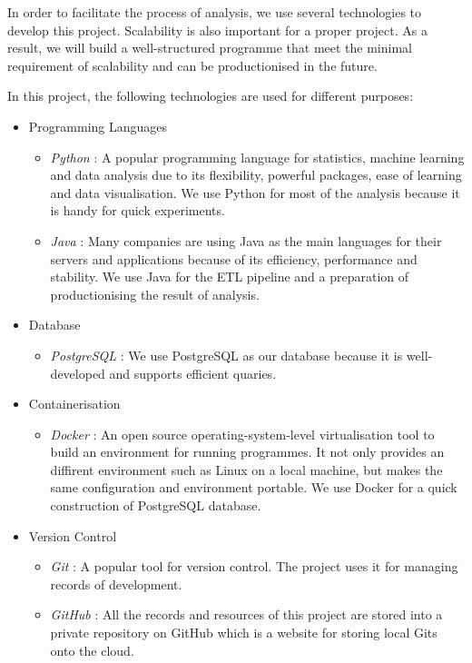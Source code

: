 \documentclass[11pt]{article} %
\theoremstyle{plain}
\theoremstyle{definition}
\begin{document}
In order to facilitate the process of analysis, we use several technologies to develop this project. Scalability is also important for a proper project. As a result, we will build a well-structured programme that meet the minimal requirement of scalability and can be productionised in the future.

In this project, the following technologies are used for different purposes:
\begin{itemize}
  \item Programming Languages
  \begin{itemize}
    \item \textsl{Python} : A popular programming language for statistics, machine learning and data analysis due to its flexibility, powerful packages, ease of learning and data visualisation. We use Python for most of the analysis because it is handy for quick experiments.
    \item \textsl{Java} : Many companies are using Java as the main languages for their servers and applications because of its efficiency, performance and stability. We use Java for the ETL pipeline and a preparation of productionising the result of analysis.
  \end{itemize}

  \item Database
  \begin{itemize}
    \item \textsl{PostgreSQL} : We use PostgreSQL as our database because it is well-developed and supports efficient quaries.
  \end{itemize}

  \item Containerisation
  \begin{itemize}
    \item \textsl{Docker} : An open source operating-system-level virtualisation tool to build an environment for running programmes. It not only provides an diffirent environment such as Linux on a local machine, but makes the same configuration and environment portable. We use Docker for a quick construction of PostgreSQL database.
  \end{itemize}

  \item Version Control
  \begin{itemize}
    \item \textsl{Git} : A popular tool for version control. The project uses it for managing records of development.
    \item \textsl{GitHub} : All the records and resources of this project are stored into a private repository on GitHub which is a website for storing local Gits onto the cloud.
  \end{itemize}


\end{itemize}
\end{document}
